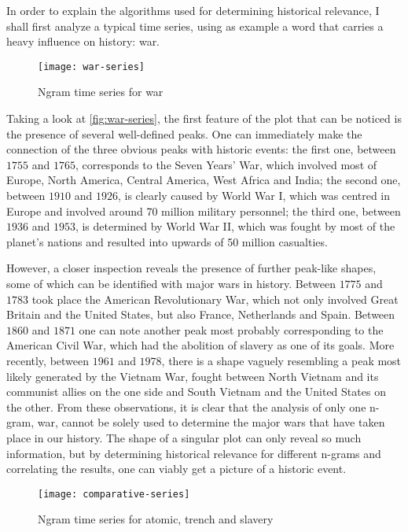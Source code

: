 
In order to explain the algorithms used for determining historical relevance, I shall first analyze a typical time series, using as example a word that carries a heavy influence on history: war.

\begin{figure}
\centering
\texttt{[image: war-series]}
\caption{Ngram time series for war}
\label{fig:war-series}
\end{figure}

Taking a look at \autoref{fig:war-series}, the first feature of the plot that can be noticed is the presence of several well-defined peaks. One can immediately make the connection of the three obvious peaks with historic events: the first one, between $1755$ and $1765$, corresponds to the Seven Years' War, which involved most of Europe, North America, Central America, West Africa and India; the second one, between $1910$ and $1926$, is clearly caused by World War I, which was centred in Europe and involved around 70 million military personnel; the third one, between $1936$ and $1953$, is determined by World War II, which was fought by most of the planet's nations and resulted into upwards of 50 million casualties.

However, a closer inspection reveals the presence of further peak-like shapes, some of which can be identified with major wars in history. Between $1775$ and $1783$ took place the American Revolutionary War, which not only involved Great Britain and the United States, but also France, Netherlands and Spain. Between $1860$ and $1871$ one can note another peak most probably corresponding to the American Civil War, which had the abolition of slavery as one of its goals. More recently, between $1961$ and $1978$, there is a shape vaguely resembling a peak most likely generated by the Vietnam War, fought between North Vietnam and its communist allies on the one side and South Vietnam and the United States on the other. From these observations, it is clear that the analysis of only one n-gram, war, cannot be solely used to determine the major wars that have taken place in our history. The shape of a singular plot can only reveal so much information, but by determining historical relevance for different n-grams and correlating the results, one can viably get a picture of a historic event.

\begin{figure}
\centering
\texttt{[image: comparative-series]}
\caption{Ngram time series for atomic, trench and slavery}
\label{fig:comparative-series}
\end{figure}

